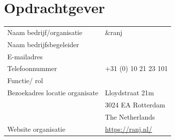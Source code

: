 \documentclass{report}
\newcommand{\organisation}{\&ranj }
\begin{document}
\section*{Opdrachtgever}
\begin{table}[h]
\begin{tabular}{ll}
Naam bedrijf/organisatie & \organisation \\
Naam bedrijfsbegeleider &  \\
E-mailadres &  \\
Telefoonnummer & +31 (0) 10 21 23 101 \\
Functie/ rol &  \\
Bezoekadres locatie organisate & Lloydstraat 21m \\ 
 & 3024 EA Rotterdam \\
 & The Netherlands \\
Website organisatie & \url{https://ranj.nl/}
\end{tabular}
\end{table}
\end{document}
